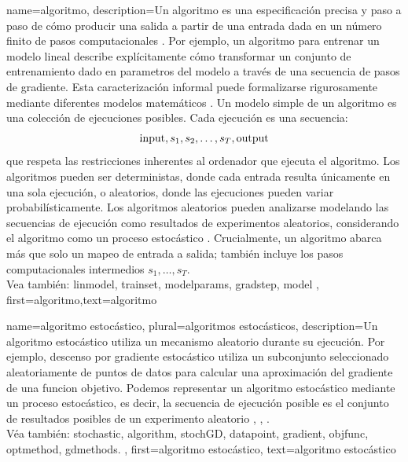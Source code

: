 {name={algoritmo},
  description={Un algoritmo es una especificación precisa y paso a paso de
    cómo producir una salida a partir de una entrada dada en un número finito de pasos computacionales \cite{Cormen:2022aa}. 
    Por ejemplo, un algoritmo para entrenar un modelo lineal describe explícitamente cómo
	transformar un conjunto de entrenamiento dado en parametros del modelo a través de una secuencia de pasos de gradiente. 
    Esta caracterización informal puede formalizarse rigurosamente mediante diferentes modelos matemáticos \cite{Sipser2013}. 
   	Un modelo simple de un algoritmo es una colección de ejecuciones posibles. Cada ejecución es una secuencia:
    $${\rm input},s_1,s_2,\ldots,s_T,{\rm output}$$ 
    que respeta las restricciones inherentes al ordenador que ejecuta el algoritmo.
	Los algoritmos pueden ser deterministas, donde cada entrada resulta únicamente en una sola ejecución,
	o aleatorios, donde las ejecuciones pueden variar probabilísticamente. Los algoritmos aleatorios 
	pueden analizarse modelando las secuencias de ejecución como resultados de experimentos aleatorios, 
	considerando el algoritmo como un proceso estocástico \cite{RandomizedAlgos,BertsekasProb,Gallager13}.
	Crucialmente, un algoritmo abarca más que solo un mapeo de entrada a salida; también incluye 
	los pasos computacionales intermedios $s_1,\ldots,s_T$. 
	\\
		Vea también: \gls{linmodel}, \gls{trainset}, \gls{modelparams}, \gls{gradstep}, \gls{model} },
	first={algoritmo},text={algoritmo} 
}

{name={algoritmo estocástico}, 
 plural={algoritmos estocásticos},
	description={Un algoritmo estocástico utiliza un mecanismo aleatorio 
		durante su ejecución. Por ejemplo, descenso por gradiente estocástico utiliza un subconjunto seleccionado aleatoriamente 
		de puntos de datos para calcular una aproximación del gradiente de una funcion objetivo. 
		Podemos representar un algoritmo estocástico mediante un proceso estocástico, 
		es decir, la secuencia de ejecución posible es el conjunto de resultados posibles de un experimento aleatorio 
		\cite{BertsekasProb}, \cite{RandomizedAlgos}, \cite{Gallager13}.\\ 
		Véa también: \gls{stochastic}, \gls{algorithm}, \gls{stochGD}, \gls{datapoint}, \gls{gradient}, 
		\gls{objfunc}, \gls{optmethod}, \gls{gdmethods}.
	},
	first={algoritmo estocástico},
	text={algoritmo estocástico}
}


